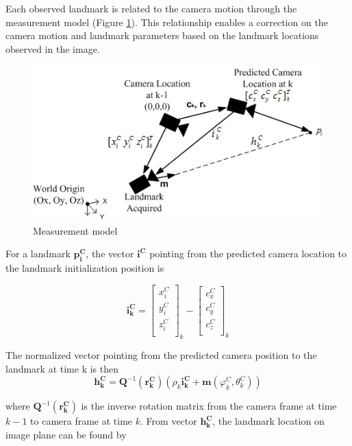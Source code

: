 Each observed landmark is related to the camera motion through the
measurement model (Figure \ref{fig:measurement_model}). This
relationship enables a correction on the camera motion and landmark
parameters based on the landmark locations observed in the image.

\begin{figure}[h]
\centering
\includegraphics[width=12cm, keepaspectratio=true]{./Figures/measurement_model.jpg}
\caption{Measurement model}
\label{fig:measurement_model}
\end{figure}
\FloatBarrier
For a landmark $\boldsymbol{p_{i}^{C}}$, the vector $\boldsymbol{i^{C}}$
pointing from the predicted camera location to the landmark
initialization position is

\begin{equation}
\boldsymbol{i_{k}^{C}}=\begin{bmatrix}
x_{i}^{C} \\
y_{i}^{C} \\
z_{i}^{C} \\
\end{bmatrix}_{k}-\begin{bmatrix}
c_{x}^{C} \\
c_{y}^{C} \\
c_{z}^{C} \\
\end{bmatrix}_{k}
\end{equation}

The normalized vector pointing from the predicted camera position to the 
landmark at time k is then 
\begin{equation}
  \boldsymbol{h_{k}^{C}}=\boldsymbol{Q}^{-1}\left(\boldsymbol{r_{k}^{C}}\right)
  \left(\rho_{k}\boldsymbol{i_{k}^{C}}+
    \boldsymbol{m}\left(\varphi_k^{C},\theta _{k}^{C}\right)\right)
\end{equation}

\noindent where $\boldsymbol{Q}^{-1}(\boldsymbol{r_{k}^{C}})$ is the inverse
rotation matrix from the camera frame at time $k-1$ to camera frame at
time $k$. From vector $\boldsymbol{h_{k}^{C}}$, the landmark location on
image plane can be found by

